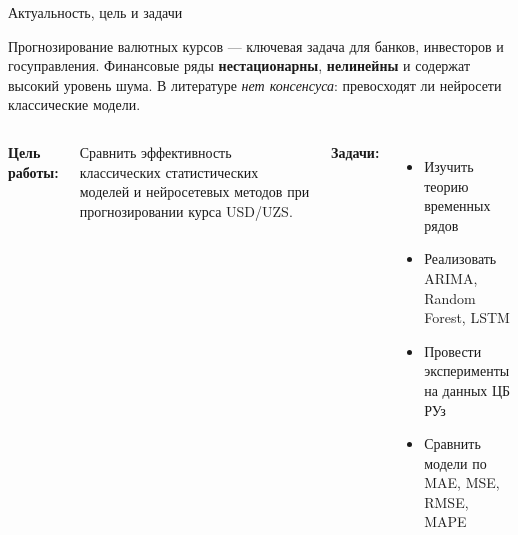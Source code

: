 \begin{frame}[shrink=10]{Актуальность, цель и задачи}

  \begin{tcolorbox}[formulabox, title={\faExclamationCircle\ Актуальность}]
    \small Прогнозирование валютных курсов --- ключевая задача для банков, инвесторов и госуправления. Финансовые ряды \textbf{нестационарны}, \textbf{нелинейны} и содержат высокий уровень шума. В литературе \textit{нет консенсуса}: превосходят ли нейросети классические модели.
  \end{tcolorbox}

  \vspace{0.2cm}
  \begin{columns}[T]
    \textbf{\color{primary}Цель работы:}
    \begin{tcolorbox}[infobox]
      \small Сравнить эффективность классических статистических моделей и нейросетевых методов при прогнозировании курса USD/UZS.
    \end{tcolorbox}

    \textbf{\color{primary}Задачи:}
    \begin{itemize}\small
      \setlength\itemsep{2pt}
      \item Изучить теорию временных рядов
      \item Реализовать ARIMA, Random Forest, LSTM
      \item Провести эксперименты на данных ЦБ РУз
      \item Сравнить модели по MAE, MSE, RMSE, MAPE
    \end{itemize}
  \end{columns}
\end{frame}
